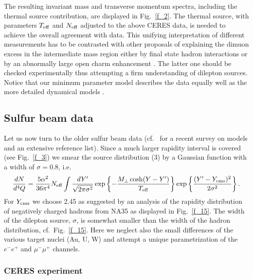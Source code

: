 The resulting invariant mass and transverse momentum spectra,
including the thermal source contribution, are displayed in Fig.~\ref{f_2}.
The thermal source, with parameters $T_{\rm eff}$ and $N_{\rm eff}$
adjusted to the above CERES data,
is needed to achieve the overall agreement with data.
This unifying interpretation of different measurements has to be
contrasted with other proposals of explaining the dimuon excess in the
intermediate mass region either by final state hadron interactions
\cite{Lin_Wang}
or by an abnormally large open charm enhancement \cite{NA50}. 
The latter one should
be checked experimentally \cite{NA6i} thus attempting a firm
understanding of dilepton sources.
Notice that our minimum parameter model describes the data equally well
as the more detailed dynamical models \cite{RappShuryak,Phys.Lett.}.

\subsection{Sulfur beam data} %

Let us now turn to the older sulfur beam data (cf.\ 
\cite{RappWambach}
for a recent survey on models and an extensive reference list). 
Since a much larger rapidity interval is covered
(see Fig.~\ref{f_3})
we smear the source distribution (3) by a Gaussian function with a width
of $\sigma = 0.8$, i.e.\ 
\begin{equation}
\frac{dN}{d^4 Q} = 
\frac{5 \alpha^2}{36 \pi^4} N_{\rm eff}
\int \frac{dY'}{\sqrt{2 \pi \sigma^2}} 
\exp \left\{ - 
\frac{M_\perp \cosh (Y - Y')}{T_{\rm eff}} \right\}
\exp \left\{ \frac{(Y' - Y_{\rm cms})^2}{2 \sigma^2} \right\}.
\end{equation}
For $Y_{\rm cms}$ we choose 2.45 
as suggested by an analysis of the
rapidity distribution of negatively charged hadrons
from NA35 \cite{NA35} as displayed in Fig.~\ref{f_15}.
The width of the dilepton source, $\sigma$, 
is somewhat smaller than the width of the hadron distribution,
cf.\ Fig.~\ref{f_15}. 
Here we neglect also the small differences of the various target nuclei
(Au, U, W)
and attempt a unique parametrization of the $e^- e^+$ and 
$\mu^- \mu^+$ channels.
 
\subsubsection{CERES experiment \label{CERES_sulfur}} %

